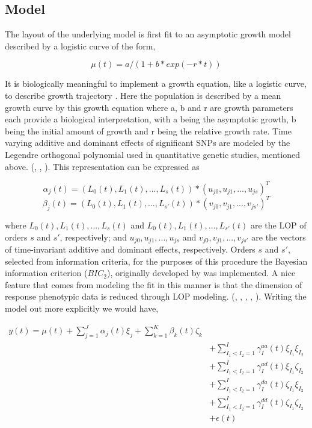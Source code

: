 \documentclass[11pt,]{book}
\theoremstyle{definition}
\theoremstyle{definition}
\theoremstyle{remark}
\begin{document}
\subsection{Model}\label{model}

The layout of the underlying model is first fit to an asymptotic growth
model described by a logistic curve of the form,

\[\mu(t) = a/(1 + b * exp(-r*t))\]

It is biologically meaningful to implement a growth equation, like a
logistic curve, to describe growth trajectory \cite{west2001general}.
Here the population is described by a mean growth curve by this growth
equation where a, b and r are growth parameters each provide a
biological interpretation, with a being the asymptotic growth, b being
the initial amount of growth and r being the relative growth rate. Time
varying additive and dominant effects of significant SNPs are modeled by
the Legendre orthogonal polynomial used in quantitative genetic studies,
mentioned above. (\cite{jiang20152higwas}, \cite{olori1999estimating},
\cite{li2010functional}). This representation can be expressed as

\[ \alpha_j(t) = (L_0(t), L_1(t), ... , L_s(t))*(u_{j0}, u_{j1},...,u_{js})^T \]
\[ \beta_j(t) = (L_0(t), L_1(t), ... , L_{s'}(t))*(v_{j0}, v_{j1},...,v_{js'})^T \]

where \(L_0(t), L_1(t), ... , L_s(t)\) and
\(L_0(t), L_1(t), ... , L_{s'}(t)\) are the LOP of orders \(s\) and
\(s'\), respectively; and \(u_{j0}, u_{j1},...,u_{js}\) and
\(v_{j0}, v_{j1},...,v_{js'}\) are the vectors of time-invariant
additive and dominant effects, respectively. Orders \(s\) and \(s'\),
selected from information criteria, for the purposes of this procedure
the Bayesian information criterion (\(BIC_2\)), originally developed by
\cite{chen2008extended} was implemented. A nice feature that comes from
modeling the fit in this manner is that the dimension of response
phenotypic data is reduced through LOP modeling.
(\cite{li2010functional}, \cite{jiang20152higwas},
\cite{li2010functional}, \cite{ahn2010functional},
\cite{das2011dynamic}). Writing the model out more explicitly we would
have,

\begin{equation}
\begin{split}
y(t) = \mu(t) + \sum_{j=1}^{J}\alpha_j(t)\xi_j + \sum_{k=1}^{K}\beta_k(t)\zeta_k \\ 
&+ \sum_{I_1<I_2=1}^{I}\gamma_I^{aa}(t) \xi_{I_1}\xi_{I_2} \\ 
&+ \sum_{I_1<I_2=1}^{I}\gamma_I^{ad}(t) \xi_{I_1}\zeta_{I_2} \\
&+ \sum_{I_1<I_2=1}^{I} \gamma_I^{da}(t) \zeta_{I_1}\xi_{I_2} \\
&+ \sum_{I_1<I_2=1}^{I} \gamma_I^{dd}(t)\zeta_{I_1}\zeta_{I_2} \\ 
&+ \epsilon(t)
\end{split}
\label{eq:epi-legendre}
\end{equation}
\end{document}
